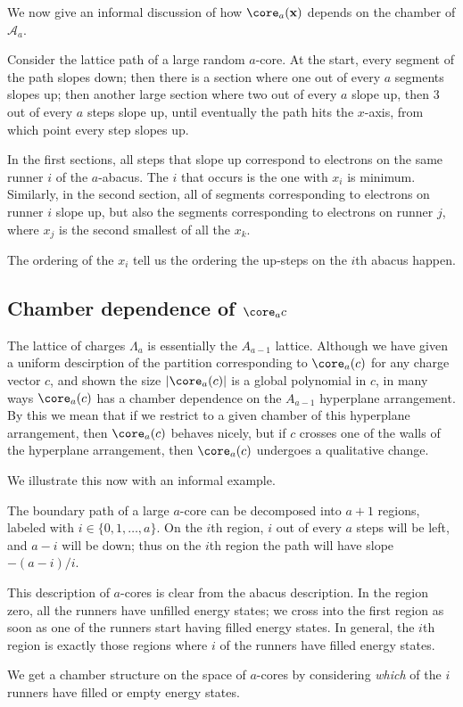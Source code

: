 

We now give an informal discussion of how $\core_a(\mathbf{x})$ depends on the chamber of $\mathcal{A}_a$.


\begin{example}
Consider the lattice path of a large random $a$-core.  At the start, every segment of the path slopes down; then there is a section where one out of every $a$ segments slopes up; then another large section where two out of every $a$ slope up, then 3 out of every $a$ steps slope up, until eventually the path hits the $x$-axis, from which point every step slopes up.

In the first sections, all steps that slope up correspond to electrons on the same runner $i$ of the $a$-abacus.  The $i$ that occurs is the one with $x_i$ is minimum.  Similarly, in the second section, all of segments corresponding to electrons on runner $i$ slope up, but also the segments corresponding to electrons on runner $j$, where $x_j$ is the second smallest of all the $x_k$.

The ordering of the $x_i$ tell us the ordering the up-steps on the $i$th abacus happen.

\end{example}
\subsection{Chamber dependence of \texorpdfstring{$\core_a{c}$}{core(c)}}

The lattice of charges $\Lambda_a$ is essentially the $A_{a-1}$ lattice.  Although we have given a uniform descirption of the partition corresponding to $\core_a(c)$ for any charge vector $c$, and shown the size $|\core_a(c)|$ is a global polynomial in $c$, in many ways $\core_a(c)$ has a chamber dependence on the $A_{a-1}$ hyperplane arrangement.  By this we mean that if we restrict to a given chamber of this hyperplane arrangement, then $\core_a(c)$ behaves nicely, but if $c$ crosses one of the walls of the hyperplane arrangement, then $\core_a(c)$ undergoes a qualitative change.


We illustrate this now with an informal example.
\begin{example}
The boundary path of a large $a$-core can be decomposed into $a+1$ regions, labeled with $i\in\{0,1,\dots,a\}$.  On the $i$th region, $i$ out of every $a$ steps will be left, and $a-i$ will be down; thus on the $i$th region the path will have slope $-(a-i)/i$.  

This description of $a$-cores is clear from the abacus description.  In the region zero, all the runners have unfilled energy states; we cross into the first region as soon as one of the runners start having filled energy states.  In general, the $i$th region is exactly those regions where $i$ of the runners have filled energy states.  

We get a chamber structure on the space of $a$-cores by considering \emph{which} of the $i$ runners have filled or empty energy states.  



\end{example}


